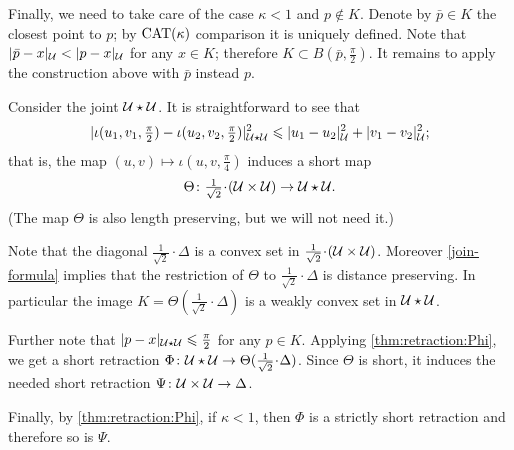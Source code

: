 \documentclass[oneside,a4paper, 12pt]{article}
\begin{document}
Finally, we need to take care of the case $\kappa<1$ and $p\notin K$.
Denote by $\bar p\in K$ the closest point to $p$; by $\mathrm{CAT}(\kappa)$ comparison it is uniquely defined.
Note that $|\bar p-x|_{\mathcal{U}}< |p-x|_{\mathcal{U}}$ for any $x\in K$;
therefore $K\subset B(\bar p,\tfrac\pi2)$. 
It remains to apply the construction above with $\bar p$ instead $p$.
\qeds


Consider the joint $\mathcal{U}\star\mathcal{U}$.
It is straightforward to see that 
\[|\iota(u_1,v_1,\tfrac\pi2)-\iota(u_2,v_2,\tfrac\pi2)|^2_{\mathcal{U}\star\mathcal{U}}\leqslant |u_1-u_2|^2_{\mathcal{U}}+|v_1-v_2|_{\mathcal{U}}^2;\]
that is, the map $(u,v)\mapsto \iota(u,v,\tfrac\pi4)$ induces a short map 
\[\Theta\:{\tfrac1{\sqrt{2}}}\cdot(\spc{U}\times\spc{U})\to\spc{U}\star\spc{U}.\]
(The map $\Theta$ is also length preserving, but we will not need it.)

Note that the diagonal $\tfrac1{\sqrt{2}}\cdot\Delta$ is a convex set in $\tfrac1{\sqrt{2}}\cdot(\spc{U}\times\spc{U})$.
Moreover \ref{join-formula} implies that the restriction of $\Theta$ to $\tfrac1{\sqrt{2}}\cdot\Delta$ is distance preserving.
In particular the image $K=\Theta(\tfrac1{\sqrt{2}}\cdot\Delta)$ is a weakly convex set in $\mathcal{U}\star\mathcal{U}$.

Further note that $|p-x|_{\mathcal{U}\star\mathcal{U}}\leqslant \tfrac\pi2$ for any $p\in K$.
Applying \ref{thm:retraction:Phi}, we get a short retraction $\Phi\:\spc{U}\star\spc{U}\to \Theta(\tfrac1{\sqrt{2}}\cdot\Delta)$.
Since $\Theta$ is short, it induces the needed short retraction $\Psi\colon\mathcal{U}\times\mathcal{U}\to \Delta$.

Finally, by \ref{thm:retraction:Phi}, if $\kappa<1$, then $\Phi$ is a strictly short retraction and therefore so is $\Psi$.
\qeds



{\small\sloppy

\printbibliography[heading=bibintoc]

}
\end{document}
